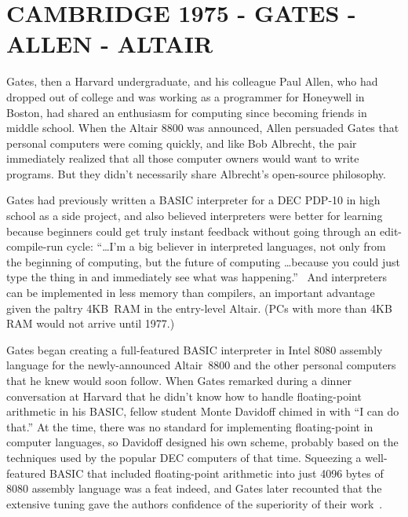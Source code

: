 
\section{CAMBRIDGE 1975 - GATES - ALLEN - ALTAIR}




Gates, then a Harvard undergraduate, and his colleague 
Paul Allen, who
had dropped out of college and was working as a programmer for Honeywell
in Boston, had shared an enthusiasm for computing since becoming
friends in middle school.
When the Altair 8800 was announced,
Allen persuaded Gates that personal computers were coming quickly, and
like Bob Albrecht, the pair immediately realized that all those
computer owners would want to write programs.
But they didn't necessarily share Albrecht's open-source philosophy.  

Gates had
previously written a BASIC interpreter for  a DEC PDP-10 in high school
as a side project, and also believed interpreters were better for
learning because
beginners could get truly instant feedback without going through an
edit-compile-run cycle:
``\ldots I'm a big believer in interpreted languages,
not only from the beginning of computing, but the future of
computing \ldots because you could just type
the thing in and immediately see what was
happening.''~\cite{smithsonian_interview} 
And interpreters can be implemented in less memory than compilers,
an important advantage given the paltry 4KB~RAM in the entry-level  Altair.
(PCs with more than 4KB RAM would not arrive until 1977.)

Gates began creating a full-featured BASIC interpreter  in Intel 8080
assembly language for the
newly-announced Altair~8800 and the other personal computers that he
knew would soon follow.
When Gates remarked during a dinner conversation at Harvard
that he didn't know how to handle floating-point arithmetic in his
BASIC, fellow student Monte Davidoff chimed in with ``I can do that.''
At the time, there was no standard for implementing floating-point in
computer languages, so Davidoff designed his own scheme, probably based
on the techniques used by the popular DEC computers of that time.
Squeezing a well-featured BASIC that included floating-point arithmetic
into just 
4096 bytes of 8080 assembly language was a feat indeed, and Gates later
recounted that the extensive tuning
gave the authors confidence of the superiority of their
work~\cite{programmers_at_work}.  

